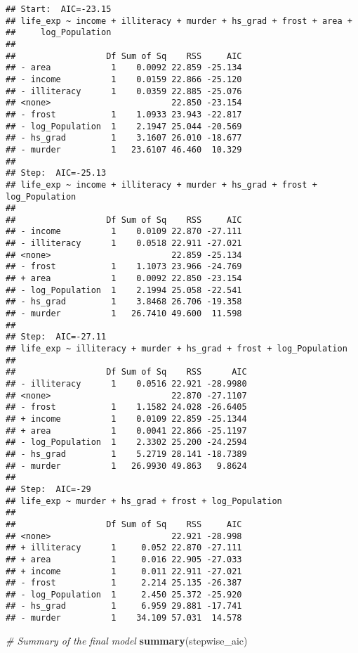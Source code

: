 \documentclass[
]{article}
\newenvironment{Shaded}{\begin{snugshade}}{\end{snugshade}}
\newcommand{\CommentTok}[1]{\textcolor[rgb]{0.56,0.35,0.01}{\textit{#1}}}
\newcommand{\FunctionTok}[1]{\textcolor[rgb]{0.13,0.29,0.53}{\textbf{#1}}}
\newcommand{\NormalTok}[1]{#1}
\begin{document}
\begin{verbatim}
## Start:  AIC=-23.15
## life_exp ~ income + illiteracy + murder + hs_grad + frost + area + 
##     log_Population
## 
##                  Df Sum of Sq    RSS     AIC
## - area            1    0.0092 22.859 -25.134
## - income          1    0.0159 22.866 -25.120
## - illiteracy      1    0.0359 22.885 -25.076
## <none>                        22.850 -23.154
## - frost           1    1.0933 23.943 -22.817
## - log_Population  1    2.1947 25.044 -20.569
## - hs_grad         1    3.1607 26.010 -18.677
## - murder          1   23.6107 46.460  10.329
## 
## Step:  AIC=-25.13
## life_exp ~ income + illiteracy + murder + hs_grad + frost + log_Population
## 
##                  Df Sum of Sq    RSS     AIC
## - income          1    0.0109 22.870 -27.111
## - illiteracy      1    0.0518 22.911 -27.021
## <none>                        22.859 -25.134
## - frost           1    1.1073 23.966 -24.769
## + area            1    0.0092 22.850 -23.154
## - log_Population  1    2.1994 25.058 -22.541
## - hs_grad         1    3.8468 26.706 -19.358
## - murder          1   26.7410 49.600  11.598
## 
## Step:  AIC=-27.11
## life_exp ~ illiteracy + murder + hs_grad + frost + log_Population
## 
##                  Df Sum of Sq    RSS      AIC
## - illiteracy      1    0.0516 22.921 -28.9980
## <none>                        22.870 -27.1107
## - frost           1    1.1582 24.028 -26.6405
## + income          1    0.0109 22.859 -25.1344
## + area            1    0.0041 22.866 -25.1197
## - log_Population  1    2.3302 25.200 -24.2594
## - hs_grad         1    5.2719 28.141 -18.7389
## - murder          1   26.9930 49.863   9.8624
## 
## Step:  AIC=-29
## life_exp ~ murder + hs_grad + frost + log_Population
## 
##                  Df Sum of Sq    RSS     AIC
## <none>                        22.921 -28.998
## + illiteracy      1     0.052 22.870 -27.111
## + area            1     0.016 22.905 -27.033
## + income          1     0.011 22.911 -27.021
## - frost           1     2.214 25.135 -26.387
## - log_Population  1     2.450 25.372 -25.920
## - hs_grad         1     6.959 29.881 -17.741
## - murder          1    34.109 57.031  14.578
\end{verbatim}

\begin{Shaded}
\begin{Highlighting}[]
\CommentTok{\# Summary of the final model}
\FunctionTok{summary}\NormalTok{(stepwise\_aic)}
\end{Highlighting}
\end{Shaded}
\end{document}
